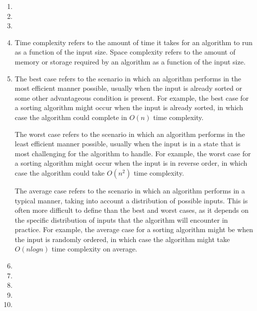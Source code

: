 \documentclass{article}
\begin{document}
\begin{enumerate}
\begin{enumerate}
    \end{enumerate}
    
    \item 

    \item 

    \item 
    
    \item  Time complexity refers to the amount of time it takes for an algorithm to run as a function of the input size.
    Space complexity refers to the amount of memory or storage required by an algorithm as a function of the input size. 
    
    \item  The best case refers to the scenario in which an algorithm performs in the most efficient manner possible, usually when the input is already sorted or some other advantageous condition is present. For example, the best case for a sorting algorithm might occur when the input is already sorted, in which case the algorithm could complete in $O(n)$ time complexity.
    
    The worst case refers to the scenario in which an algorithm performs in the least efficient manner possible, usually when the input is in a state that is most challenging for the algorithm to handle. For example, the worst case for a sorting algorithm might occur when the input is in reverse order, in which case the algorithm could take $O(n^2)$ time complexity.
    
    The average case refers to the scenario in which an algorithm performs in a typical manner, taking into account a distribution of possible inputs. This is often more difficult to define than the best and worst cases, as it depends on the specific distribution of inputs that the algorithm will encounter in practice. For example, the average case for a sorting algorithm might be when the input is randomly ordered, in which case the algorithm might take $O(n log n)$ time complexity on average.

    

\item 

\item 

\item 

\item 

\item 


\end{enumerate}
\end{document}
